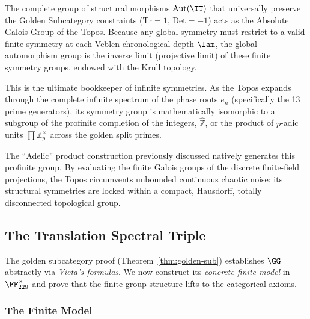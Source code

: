 \begin{definition}
The complete group of structural morphisms $\mathrm{Aut}(\TT)$ that universally preserve the Golden Subcategory constraints ($\mathrm{Tr} = 1$, $\mathrm{Det} = -1$) acts as the Absolute Galois Group of the Topos. Because any global symmetry must restrict to a valid finite symmetry at each Veblen chronological depth $\lam$, the global automorphism group is the inverse limit (projective limit) of these finite symmetry groups, endowed with the Krull topology.
\end{definition}

This is the ultimate bookkeeper of infinite symmetries. As the Topos expands through the complete infinite spectrum of the phase roots $e_n$ (specifically the 13 prime generators), its symmetry group is mathematically isomorphic to a subgroup of the profinite completion of the integers, $\widehat{\mathbb{Z}}$, or the product of $p$-adic units $\prod \mathbb{Z}_p^\times$ across the golden split primes.

The ``Adelic'' product construction previously discussed natively generates this profinite group. By evaluating the finite Galois groups of the discrete finite-field projections, the Topos circumvents unbounded continuous chaotic noise: its structural symmetries are locked within a compact, Hausdorff, totally disconnected topological group.

\subsection{The Translation Spectral Triple}

The golden subcategory proof (Theorem~\ref{thm:golden-sub}) establishes $\GG$ abstractly via \emph{Vieta's formulas}. We now construct its \emph{concrete finite model} in $\FF_{229}^\times$ and prove that the finite group structure lifts to the categorical axioms.

\subsubsection*{The Finite Model}


